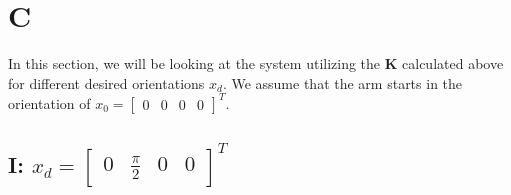 \documentclass{article}
\begin{document}
\section*{C}

In this section, we will be looking at the system utilizing the $\boldsymbol{K}$ calculated above for different desired orientations $x_d$. We assume that the arm starts in the orientation of $x_0 = \begin{bmatrix}
    0 & 0 & 0 & 0
\end{bmatrix} ^ T $.

\subsection*{I: $x_d = \begin{bmatrix} 0 & \frac{\pi}{2} & 0 & 0 \end{bmatrix}^T$}
\end{document}
